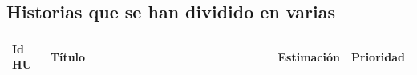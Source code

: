 \documentclass[11pt]{article}
\begin{document}
\subsection{Historias que se han dividido en varias}
\begin{table}[H]
  \centering
  \begin{tabular}{p{0.1\linewidth}p{0.7\linewidth}p{0.15\linewidth}p{0.15\linewidth}}
    \toprule
    \textbf{Id HU} & \textbf{Título} & \textbf{Estimación} & \textbf{Prioridad}\\
    \midrule

    \bottomrule
  \end{tabular}
  
\end{table}
\end{document}

